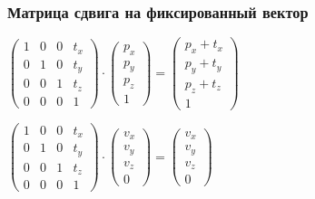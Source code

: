\documentclass[10pt]{beamer}
\begin{document}
\begin{frame}[fragile]
\frametitle{Матрица сдвига на фиксированный вектор}
\begin{center}
\begin{math}
\begin{pmatrix}
1 & 0 & 0 & t_x \\
0 & 1 & 0 & t_y \\
0 & 0 & 1 & t_z \\
0 & 0 & 0 & 1
\end{pmatrix}
\cdot
\begin{pmatrix}
p_x \\
p_y \\
p_z \\
1
\end{pmatrix}
=
\begin{pmatrix}
p_x + t_x \\
p_y + t_y\\
p_z + t_z\\
1
\end{pmatrix}
\end{math}

\begin{math}
\begin{pmatrix}
1 & 0 & 0 & t_x \\
0 & 1 & 0 & t_y \\
0 & 0 & 1 & t_z \\
0 & 0 & 0 & 1
\end{pmatrix}
\cdot
\begin{pmatrix}
v_x \\
v_y \\
v_z \\
0
\end{pmatrix}
=
\begin{pmatrix}
v_x\\
v_y\\
v_z\\
0
\end{pmatrix}
\end{math}
\end{center}
\end{frame}
\end{document}
